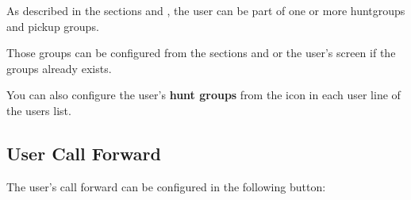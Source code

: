 \documentclass[letterpaper,10pt,english]{sphinxmanual}
\begin{document}
As described in the sections {\hyperref[pbx_features/huntgroups:huntgroups]{}} and {\hyperref[pbx_features/call_captures:capture\string-groups]{}}, the
user can be part of one or more huntgroups and pickup groups.

Those groups can be configured from the sections {\hyperref[pbx_features/huntgroups:huntgroups]{}} and
{\hyperref[pbx_features/call_captures:capture\string-groups]{}} or the user's screen if the groups already exists.

You can also configure the user's \textbf{hunt groups} from the icon in each user
line of the users list.



\subsection{User Call Forward}
\label{pbx_features/users:user-call-forward}
The user's call forward can be configured in the following button:
\end{document}
